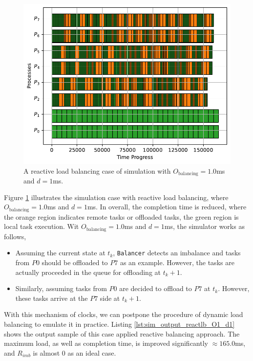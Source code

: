 \begin{figure}[t]
  \centering
  \includegraphics[scale=0.65]{./pictures/poc_implementation/poc_visualize_reactlb_O1_d1_8_processes.pdf}
	\caption{A reactive load balancing case of simulation with $O_{\text{balancing}} = 1.0$ms and $d=1$ms.}
	\label{fig:simulator_reactlb_O1_d1_case}
\end{figure}

Figure \ref{fig:simulator_reactlb_O1_d1_case} illustrates the simulation case with reactive load balancing, where $O_{\text{balancing}} = 1.0$ms and $d=1$ms. In overall, the completion time is reduced, where the orange region indicates remote tasks or offloaded tasks, the green region is local task execution. Wit $O_{\text{balancing}} = 1.0$ms and $d=1$ms, the simulator works as follows,
\begin{itemize}
	\item Assuming the current state at $t_{k}$, \texttt{Balancer} detects an imbalance and tasks from $P0$ should be offloaded to $P7$ as an example. However, the tasks are actually proceeded in the queue for offloading at $t_{k} + 1$.
	\item Similarly, assuming tasks from $P0$ are decided to offload to $P7$ at $t_{k}$. However, these tasks arrive at the $P7$ side at $t_{k} + 1$.
\end{itemize}

With this mechanism of clocks, we can postpone the procedure of dynamic load balancing to emulate it in practice. Listing \ref{lst:sim_output_reactlb_O1_d1} shows the output sample of this case applied reactive balancing approach. The maximum load, as well as completion time, is improved significantly $\approx 165.0$ms, and $R_{imb}$ is almost $0$ as an ideal case.

